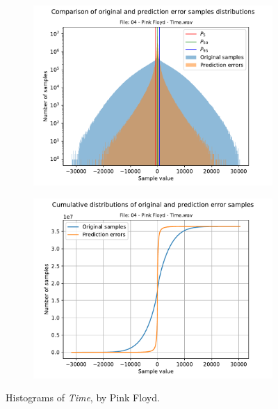 \begin{figure}[h!]
	\centering
	\begin{subfigure}{0.45\textwidth}
		\centering
		\includegraphics[width=\linewidth]{images/wave_hists/04 - Pink Floyd - Time.wav_hist.pdf}
	\end{subfigure}%
	\begin{subfigure}{0.45\textwidth}
		\centering
		\includegraphics[width=\linewidth]{images/wave_hists/04 - Pink Floyd - Time.wav_hist_cum.pdf}
	\end{subfigure}
	\caption{Histograms of \textit{Time}, by Pink Floyd.}
	\label{fig:time_pink_floyd}
\end{figure}

